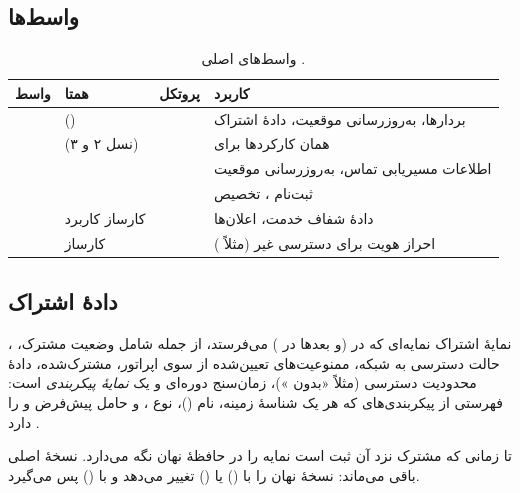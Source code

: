 \documentclass[11pt,a4paper]{article}
\begin{document}
\subsection{واسط‌ها}
\begin{table}[htbp]
\centering\small
\caption{واسط‌های اصلی .}\label{tab:ifaces}
\begin{tabularx}{\linewidth}{@{}l l l Y@{}}
\toprule
{}واسط & همتا & پروتکل & کاربرد \\
\midrule
{} &  () &  & بردارها، به‌روزرسانی موقعیت، دادهٔ اشتراک \cite{ts29272} \\
        &  (نسل ۲ و ۳)       &     & همان کارکردها برای  \cite{ts29002} \\
     &          &     & اطلاعات مسیریابی تماس، به‌روزرسانی موقعیت  \cite{ts29002} \\
        &         &  & ثبت‌نام ، تخصیص  \\
        & کارساز کاربرد              &  & دادهٔ شفاف خدمت، اعلان‌ها \\
       & کارساز         &  & احراز هویت برای دسترسی غیر (مثلاً ) \\
\bottomrule
\end{tabularx}
\end{table}

\subsection{دادهٔ اشتراک}
\begin{definitionbox}{نمایهٔ اشتراک }
نمایه‌ای که  در  (و بعدها در ) می‌فرستد، از جمله شامل وضعیت مشترک، ، حالت
دسترسی به شبکه، ممنوعیت‌های تعیین‌شده از سوی اپراتور،  مشترک‌شده، دادهٔ محدودیت دسترسی (مثلاً «بدون
»)، زمان‌سنج  دوره‌ای و یک \emph{نمایهٔ پیکربندی } است: فهرستی از پیکربندی‌های
 که هر یک شناسهٔ زمینه، نام  ()، نوع ،  و 
حامل پیش‌فرض و  را دارد \cite{ts29272}.
\end{definitionbox}
 تا زمانی که مشترک نزد آن ثبت است نمایه را در حافظهٔ نهان نگه می‌دارد.  نسخهٔ اصلی باقی می‌ماند: نسخهٔ
نهان را با  () یا  () تغییر می‌دهد و با
 () پس می‌گیرد.
\end{document}
